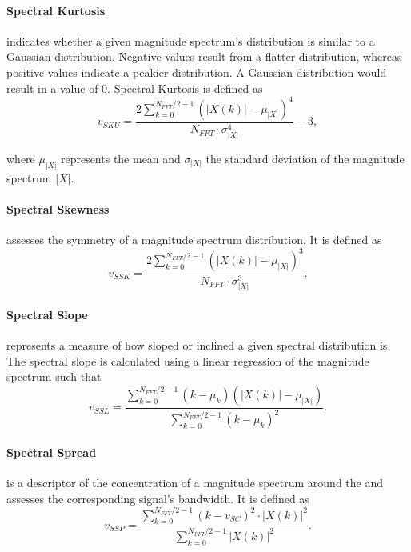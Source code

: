 \paragraph{Spectral Kurtosis}
\label{para:kurtosis}
indicates whether a given magnitude spectrum's distribution is similar to a
Gaussian distribution. Negative values result from a flatter distribution,
whereas positive values indicate a peakier distribution. A Gaussian
distribution would result in a value of 0. Spectral Kurtosis is defined as
\begin{equation}
  v_{SKU} = \frac{ 2 \sum\limits_{k=0}^{N_{FFT}/2-1} (|X(k)|
  - \mu_{|X|})^4 }
  { N_{FFT}\cdot{\sigma_{|X|}^4} } - 3,
\end{equation}

where $\mu_{|X|}$ represents the mean and $\sigma_{|X|}$ the standard deviation
of the magnitude spectrum $|X|$.

\paragraph{Spectral Skewness}
\label{para:skewness}
assesses the symmetry of a magnitude spectrum distribution. It is defined as
\begin{equation}
  v_{SSK} = \frac{ 2 \sum\limits_{k=0}^{N_{FFT}/2-1} (|X(k)|
  - \mu_{|X|})^3 }
  { N_{FFT}\cdot{\sigma_{|X|}^3} }.
\end{equation}

\paragraph{Spectral Slope}
\label{para:slope}
represents a measure of how sloped or inclined a given spectral distribution is.
The spectral slope is calculated using a linear regression of the magnitude
spectrum such that
\begin{equation}
  v_{SSL} = \frac{ \sum\limits_{k=0}^{N_{FFT}/2-1} (k - \mu_{k}) (|X(k)|
  - \mu_{|X|}) }
  { \sum\limits_{k=0}^{N_{FFT}/2-1} (k - \mu_{k})^2 }.
\end{equation}

\paragraph{Spectral Spread}
\label{para:spread}
is a descriptor of the concentration of a magnitude spectrum around the
 and assesses the corresponding signal's bandwidth. It is
defined as
\begin{equation}
  v_{SSP} = \frac{ \sum\limits_{k=0}^{N_{FFT}/2-1} (k - v_{SC})^2
  \cdot{ |X(k)|^2 } }
  { \sum\limits_{k=0}^{N_{FFT}/2-1} |X(k)|^2 }.
\end{equation}

